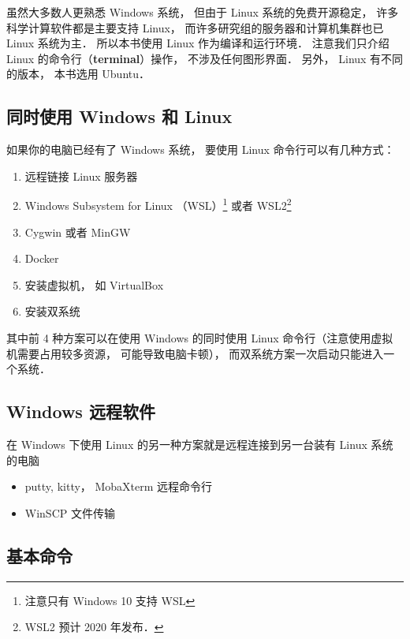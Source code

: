 
\begin{issues}
\issueTODO
\end{issues}

虽然大多数人更熟悉 Windows 系统， 但由于 Linux 系统的免费开源稳定， 许多科学计算软件都是主要支持 Linux， 而许多研究组的服务器和计算机集群也已 Linux 系统为主． 所以本书使用 Linux 作为编译和运行环境． 注意我们只介绍 Linux 的命令行（\textbf{terminal}）操作， 不涉及任何图形界面． 另外， Linux 有不同的版本， 本书选用 Ubuntu．

\subsection{同时使用 Windows 和 Linux}
如果你的电脑已经有了 Windows 系统， 要使用 Linux 命令行可以有几种方式：
\begin{enumerate}
\item 远程链接 Linux 服务器
\item Windows Subsystem for Linux （WSL）\footnote{注意只有 Windows 10 支持 WSL} 或者 WSL2\footnote{WSL2 预计 2020 年发布．}
\item Cygwin 或者 MinGW
\item Docker
\item 安装虚拟机， 如 VirtualBox
\item 安装双系统
\end{enumerate}
其中前 4 种方案可以在使用 Windows 的同时使用 Linux 命令行（注意使用虚拟机需要占用较多资源， 可能导致电脑卡顿）， 而双系统方案一次启动只能进入一个系统．

\subsection{Windows 远程软件}
在 Windows 下使用 Linux 的另一种方案就是远程连接到另一台装有 Linux 系统的电脑
\begin{itemize}
\item putty, kitty， MobaXterm 远程命令行
\item WinSCP 文件传输
\end{itemize}

\subsection{基本命令}

